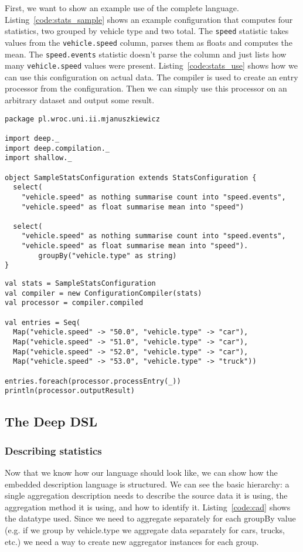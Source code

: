 First, we want to show an example use of the complete language.
Listing~\ref{code:stats_sample} shows an example configuration that computes four statistics, two grouped by vehicle type and two total.
The \texttt{speed} statistic takes values from the \texttt{vehicle.speed} column, parses them as floats and computes the mean.
The \texttt{speed.events} statistic doesn't parse the column and just lists how many \texttt{vehicle.speed} values were present.
Listing~\ref{code:stats_use} shows how we can use this configuration on actual data.
The compiler is used to create an entry processor from the configuration.
Then we can simply use this processor on an arbitrary dataset and output some result.

\begin{lstlisting}[caption=Defined statistics, label=code:stats_sample]
package pl.wroc.uni.ii.mjanuszkiewicz

import deep._
import deep.compilation._
import shallow._

object SampleStatsConfiguration extends StatsConfiguration {
  select(
    "vehicle.speed" as nothing summarise count into "speed.events",
    "vehicle.speed" as float summarise mean into "speed")

  select(
    "vehicle.speed" as nothing summarise count into "speed.events",
    "vehicle.speed" as float summarise mean into "speed").
		groupBy("vehicle.type" as string)
}
\end{lstlisting}

\begin{lstlisting}[caption=Using statistics, label=code:stats_use]
val stats = SampleStatsConfiguration
val compiler = new ConfigurationCompiler(stats)
val processor = compiler.compiled

val entries = Seq(
  Map("vehicle.speed" -> "50.0", "vehicle.type" -> "car"),
  Map("vehicle.speed" -> "51.0", "vehicle.type" -> "car"),
  Map("vehicle.speed" -> "52.0", "vehicle.type" -> "car"),
  Map("vehicle.speed" -> "53.0", "vehicle.type" -> "truck"))

entries.foreach(processor.processEntry(_))
println(processor.outputResult)
\end{lstlisting}

\subsection{The Deep DSL}

\subsubsection{Describing statistics}
Now that we know how our language should look like, we can show how the embedded description language is structured.
We can see the basic hierarchy: a single aggregation description needs to describe the source data it is using, the aggregation method it is using, and how to identify it.
Listing~\ref{code:cad} shows the datatype used.
Since we need to aggregate separately for each groupBy value (e.g. if we group by vehicle.type we aggregate data separately for cars, trucks, etc.) we need a way to create new aggregator instances for each group.

